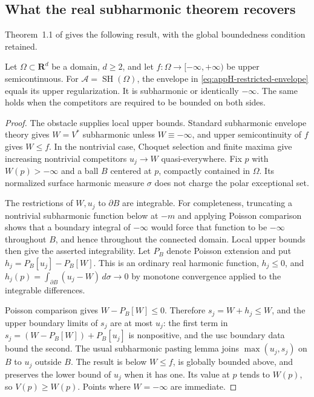 \subsection{What the real subharmonic theorem recovers}
\label{sec:appH-subharmonic-restricted-envelope}

Theorem~1.1 of \cite[actual pp.~1, 3--4]{Wikstrom26BoundedMinorantsV2}
gives the following result, with the global boundedness condition retained.

\begin{proposition}
\label{prop:appH-subharmonic-restricted-envelope}
Let $\Omega\subset\mathbf R^d$ be a domain, $d\geq2$, and let
$f:\Omega\to[-\infty,+\infty)$ be upper semicontinuous. For
$\mathcal A=\operatorname{SH}(\Omega)$, the envelope in
\eqref{eq:appH-restricted-envelope} equals its upper regularization.
It is subharmonic or identically $-\infty$. The same holds when the
competitors are required to be bounded on both sides.
\end{proposition}

\begin{proof}
The obstacle supplies local upper bounds. Standard subharmonic envelope
theory gives $W=V^*$ subharmonic unless $W\equiv-\infty$, and
upper semicontinuity of $f$ gives $W\leq f$. In the nontrivial case,
Choquet selection and finite maxima give increasing nontrivial
competitors $u_j\to W$ quasi-everywhere. Fix $p$ with $W(p)>-\infty$
and a ball $B$ centered at $p$, compactly contained in $\Omega$.
Its normalized surface harmonic measure $\sigma$ does not charge the
polar exceptional set.

The restrictions of $W,u_j$ to $\partial B$ are integrable.
For completeness, truncating a nontrivial subharmonic function below
at $-m$ and applying Poisson comparison shows that a boundary integral
of $-\infty$ would force that function to be $-\infty$ throughout $B$,
and hence throughout the connected domain. Local upper bounds then
give the asserted integrability. Let $P_B$ denote Poisson extension and
put $h_j=P_B[u_j]-P_B[W]$. This is an ordinary real harmonic function,
$h_j\leq0$, and $h_j(p)=\int_{\partial B}(u_j-W)\,d\sigma\to0$
by monotone convergence applied to the integrable differences.

Poisson comparison gives $W-P_B[W]\leq0$. Therefore
$s_j=W+h_j\leq W$, and the upper boundary limits of $s_j$ are at most
$u_j$: the first term in $s_j=(W-P_B[W])+P_B[u_j]$ is nonpositive,
and the usc boundary data bound the second. The usual subharmonic
pasting lemma joins $\max(u_j,s_j)$ on $B$ to $u_j$ outside $B$.
The result is below $W\leq f$, is globally bounded above, and preserves
the lower bound of $u_j$ when it has one. Its value at $p$ tends to
$W(p)$, so $V(p)\geq W(p)$. Points where $W=-\infty$ are immediate.
\end{proof}

